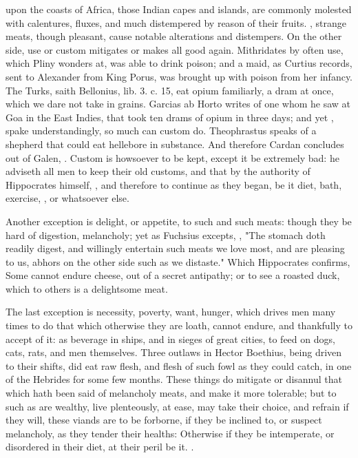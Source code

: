 upon the coasts of Africa, those Indian capes and islands, are commonly
molested with calentures, fluxes, and much distempered by reason of their
fruits. , strange meats, though pleasant, cause notable
alterations and distempers. On the other side, use or custom mitigates or makes
all good again. Mithridates by often use, which Pliny wonders at, was able to
drink poison; and a maid, as Curtius records, sent to Alexander from King
Porus, was brought up with poison from her infancy. The Turks, saith Bellonius,
lib. 3. c. 15, eat opium familiarly, a dram at once, which we dare not take in
grains. Garcias ab Horto writes of one whom he saw at Goa
in the East Indies, that took ten drams of opium in three days; and yet
, spake understandingly, so much can custom do.
Theophrastus speaks of a shepherd that could eat hellebore
in substance. And therefore Cardan concludes out of Galen, . Custom is howsoever to be kept, except it
be extremely bad: he adviseth all men to keep their old customs, and that by
the authority of Hippocrates himself, , and therefore to
continue as they began, be it diet, bath, exercise,
\etc{}, or whatsoever else.

Another exception is delight, or appetite, to such and such meats: though they
be hard of digestion, melancholy; yet as Fuchsius excepts,
,
"The stomach doth readily digest, and willingly entertain
such meats we love most, and are pleasing to us, abhors on the other side such
as we distaste." Which Hippocrates confirms,  Some cannot endure cheese, out of a secret antipathy; or to see a roasted
duck, which to others is a delightsome meat.

The last exception is necessity, poverty, want, hunger, which drives men many
times to do that which otherwise they are loath, cannot endure, and thankfully
to accept of it: as beverage in ships, and in sieges of great cities, to feed
on dogs, cats, rats, and men themselves. Three outlaws in
Hector Boethius, being driven to their shifts, did eat raw
flesh, and flesh of such fowl as they could catch, in one of the Hebrides for
some few months. These things do mitigate or disannul that which hath been said
of melancholy meats, and make it more tolerable; but to such as are wealthy,
live plenteously, at ease, may take their choice, and refrain if they will,
these viands are to be forborne, if they be inclined to, or suspect melancholy,
as they tender their healths: Otherwise if they be intemperate, or disordered
in their diet, at their peril be it. .

